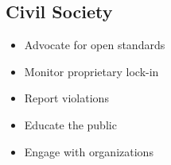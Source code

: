 \subsection{Civil Society}

\begin{itemize}
    \item Advocate for open standards
    \item Monitor proprietary lock-in
    \item Report violations
    \item Educate the public
    \item Engage with organizations
\end{itemize}

\cleardoublepage

